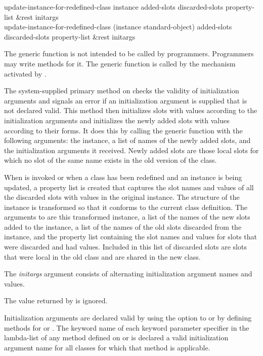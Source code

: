\begin{defun}
update-instance-for-redefined-class instance added-slots
    discarded-slots property-list &rest initargs \\
update-instance-for-redefined-class (instance standard-object) added-slots
    discarded-slots property-list &rest initargs

The generic function  is not
intended to be called by programmers. Programmers may
write methods for it.  The generic function 
 is called by the mechanism
activated by .

The system-supplied primary method on 
 checks the validity of
initialization arguments and signals an error if an initialization
argument is supplied that is not declared valid.  This method then
initializes slots with values according to the initialization
arguments and initializes the newly added slots with values according
to their  forms.  It does this by calling the generic
function  with the following arguments: the instance,
a list of names of the newly added slots, and the initialization
arguments it received.  Newly added slots are those local slots for which
no slot of the same name exists in the old version of the class.

When  is invoked or when a class has been
redefined and an instance is being updated, a property list is created
that captures the slot names and values of all the discarded slots with
values in the original instance.  The structure of the instance is
transformed so that it conforms to the current class definition.  The
arguments to  are this
transformed instance, a list of the names of the new slots added to the
instance, a list of the names of the old slots discarded from the
instance, and the property list containing the slot names and values for
slots that were discarded and had values.  Included in this list of
discarded slots are slots that were local in the old class and are
shared in the new class.

The \emph{initargs} argument consists of alternating initialization
argument names and values.

The value returned by  is ignored.

Initialization arguments are declared valid by using the 
 option to  or by defining methods for 
 or .  The
keyword name of each keyword parameter specifier in the lambda-list of
any method defined on  or 
 is declared a valid initialization argument name
for all classes for which that method is applicable.


\end{defun}
